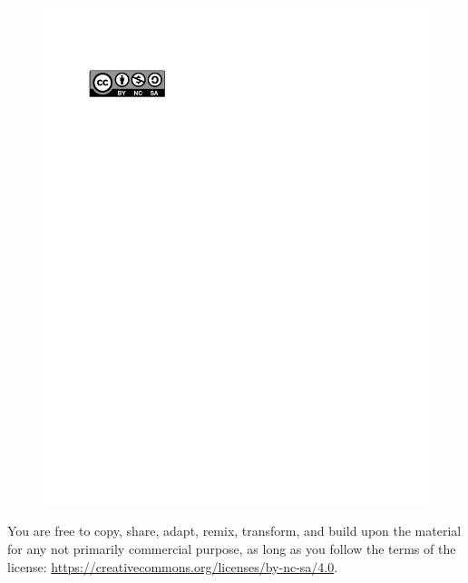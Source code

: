 \documentclass{AeroStructure-ERJohnson}
\begin{document}
{{\begin{figure}
\vspace{-18pt}
\includegraphics{CR_Logo.pdf}
\end{figure}
You are free to copy, share, adapt, remix, transform, and build upon
the material\\
for any not primarily commercial purpose, as long as you follow the
terms of the\\
license: \url{https://creativecommons.org/licenses/by-nc-sa/4.0}.

}

\vspace{18pt}

}
\end{document}
